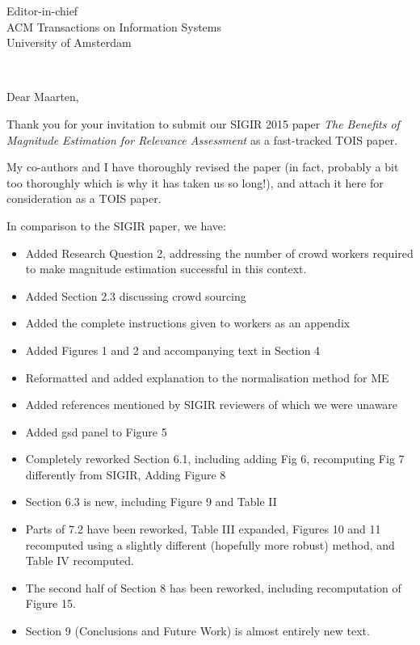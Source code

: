 \documentclass{letter}
\makeatletter
\renewcommand*{\opening}[1]{%
  \vspace*{-3cm}%
  \begin{minipage}[t]{0.5\textwidth}%
    \toname \\ 
    \toaddress
  \end{minipage}\hfill\@date\par
  \vspace{2\parskip}%
  #1\par\nobreak}
\makeatother
\begin{document}
\thispagestyle{empty}

\begin{letter}{Editor-in-chief\\ ACM Transactions on Information Systems\\ University of Amsterdam}

\opening{Dear Maarten,}

Thank you for your invitation to submit our SIGIR 2015 paper 
\emph{The Benefits of Magnitude Estimation for Relevance Assessment}
as a fast-tracked TOIS paper.

My co-authors and I have thoroughly revised the paper (in fact, probably a bit too
thoroughly which is why it has taken us so long!), and attach it here
for consideration as a TOIS paper.

In comparison to the SIGIR paper, we have:
\begin{itemize}
    \item Added Research Question 2, addressing the number of crowd
          workers required to make magnitude estimation successful in this context.
    \item Added Section 2.3 discussing crowd sourcing
    \item Added the complete instructions given to workers as an appendix
    \item Added Figures 1 and 2 and accompanying text in Section 4
    \item Reformatted and added explanation to the normalisation method for ME
    \item Added references mentioned by SIGIR reviewers of which we were unaware
    \item Added gsd panel to Figure 5
    \item Completely reworked Section 6.1, including adding Fig 6, recomputing
          Fig 7 differently from SIGIR, Adding Figure 8
    \item Section 6.3 is new, including Figure 9 and Table II
    \item Parts of 7.2 have been reworked, Table III expanded, Figures 
          10 and 11 recomputed using a slightly different (hopefully more robust) method, 
          and Table IV recomputed.
    \item The second half of Section 8 has been reworked, including recomputation of Figure 15.
    \item Section 9 (Conclusions and Future Work) is almost entirely new text.
\end{itemize}


\end{letter}
\end{document}
